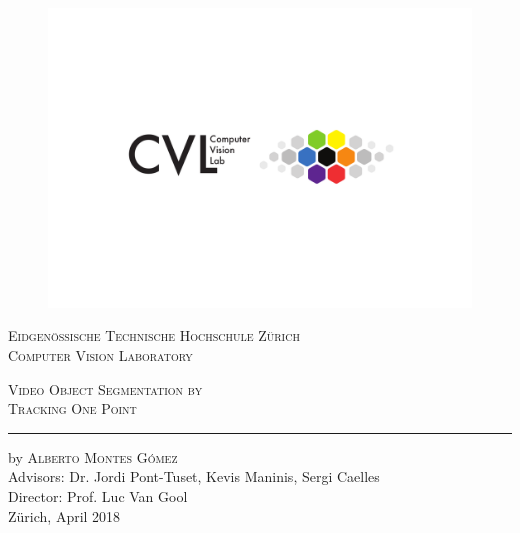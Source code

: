 
\begin{titlingpage}
\begin{center}

\begin{figure}
  \includegraphics[trim={0 6cm 0 4cm},clip,width=1\linewidth]{figures/cvl_logo.pdf}
\end{figure}

{\selectfont
\large{\textsc{Eidgen\"ossische Technische Hochschule Z\"urich\\[1mm]
Computer Vision Laboratory\\[25mm]}}

\huge{\textsc{Video Object Segmentation by \\ Tracking One Point}}
\vskip 0.5cm
\hrule
\vskip 2.6cm

\Large
by \textsc{Alberto Montes G\'omez}\\[2cm]

\large
Advisors: Dr. Jordi Pont-Tuset, Kevis Maninis, Sergi Caelles\\
Director: Prof. Luc Van Gool\\
Z\"urich, April 2018}
\end{center}
\end{titlingpage}
